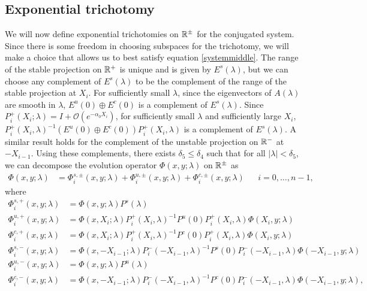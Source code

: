 \documentclass[12pt]{elsarticle}
\theoremstyle{plain}
\theoremstyle{definition}
\theoremstyle{remark}
\numberwithin{theorem}{section}
\numberwithin{equation}{section}
\begin{document}
\subsection{Exponential trichotomy}\label{sec:trichotomy}

We will now define exponential trichotomies on $\mathbb{R}^\pm$ for the conjugated system. Since there is some freedom in choosing subspaces for the trichotomy, we will make a choice that allows us to best satisfy equation \cref{systemmiddle}. The range of the stable projection on $\mathbb{R}^+$ is unique and is given by $E^s(\lambda)$, but we can choose any complement of $E^s(\lambda)$ to be the complement of the range of the stable projection at $X_i$. For sufficiently small $\lambda$, since the eigenvectors of $A(\lambda)$ are smooth in $\lambda$, $E^u(0)\oplus E^c(0)$ is a complement of $E^s(\lambda)$. Since $P_i^+(X_i; \lambda) = I + \mathcal{O}(e^{-\alpha_0 X_i})$, for sufficiently small $\lambda$ and sufficiently large $X_i$, $P_i^+(X_i, \lambda)^{-1} ( E^u(0)\oplus E^c(0) ) P_i^+(X_i, \lambda)$ is a complement of $E^s(\lambda)$. A similar result holds for the complement of the unstable projection on $\mathbb{R}^-$ at $-X_{i-1}$. Using these complements, there exists $\delta_5 \leq \delta_4$ such that for all $|\lambda| < \delta_5$, we can decompose the evolution operator $\Phi(x,y; \lambda)$ on $\mathbb{R}^\pm$ as
\begin{align}\label{Phidecomp}
\Phi(x, y; \lambda) &= \Phi_i^{s,\pm}(x, y; \lambda) + \Phi_i^{u,\pm}(x, y; \lambda) + \Phi_i^{c,\pm}(x, y; \lambda) && i = 0, \dots, n-1,
\end{align}
where
\begin{equation}\label{Zevolmod}
\begin{aligned}
\Phi_i^{s,+}(x, y; \lambda) &= \Phi(x, y; \lambda) P^s(\lambda) \\
\Phi_i^{u,+}(x, y; \lambda) &= \Phi(x, X_i; \lambda) P_i^+(X_i, \lambda)^{-1}
P^u(0) P_i^+(X_i, \lambda) \Phi(X_i, y; \lambda) \\
\Phi_i^{c,+}(x, y; \lambda) &= \Phi(x, X_i; \lambda) P_i^+(X_i, \lambda)^{-1}
P^c(0) P_i^+(X_i, \lambda) \Phi(X_i, y; \lambda)  \\
\Phi_i^{s,-}(x, y; \lambda) &= \Phi(x, -X_{i-1}; \lambda) P_i^-(-X_{i-1}, \lambda)^{-1}
P^s(0) P_i^-(-X_{i-1}, \lambda) \Phi(-X_{i-1}, y; \lambda) \\
\Phi_i^{u,-}(x, y; \lambda) &= \Phi(x, y; \lambda) P^u(\lambda) \\
\Phi_i^{c,-}(x, y; \lambda) &= \Phi(x, -X_{i-1}; \lambda) P_i^-(-X_{i-1}, \lambda)^{-1}
P^c(0) P_i^-(-X_{i-1}, \lambda) \Phi(-X_{i-1}, y; \lambda),
\end{aligned}
\end{equation}
\end{document}
